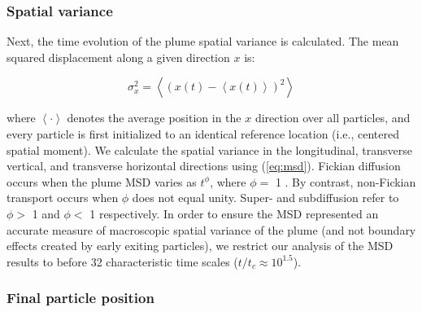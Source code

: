 %
%
\subsubsection{Spatial variance}
\label{ss_msd}

Next, the time evolution of the plume spatial variance is calculated. The mean squared displacement along a given direction $x$ is:  

\begin{equation}
\label{eq:msd}
    \sigma_{x}^2 = \left\langle (x(t) -  \left\langle x(t) \right\rangle)^2 \right\rangle
\end{equation}

where $\left\langle \cdot \right\rangle$ denotes the average position in the $x$ direction over all particles, and every particle is first initialized to an identical reference location (i.e., centered spatial moment). We calculate the spatial variance in the longitudinal, transverse vertical, and transverse horizontal directions using (\ref{eq:msd}). Fickian diffusion occurs when the plume MSD varies as $t^{\phi}$, where $\phi = $ 1 \citep{berkowitz1991dispersion, neuman1990universal}. By contrast, non-Fickian transport occurs when $\phi$ does not equal unity. Super- and subdiffusion refer to $\phi > $ 1 and $\phi < $ 1 respectively. In order to ensure the MSD represented an accurate measure of macroscopic spatial variance of the plume (and not boundary effects created by early exiting particles), we restrict our analysis of the MSD results to before 32 characteristic time scales ($t/t_c \approx 10^{1.5}$). %


%
%
\subsubsection{Final particle position}
\label{ss_rtd_pp}


